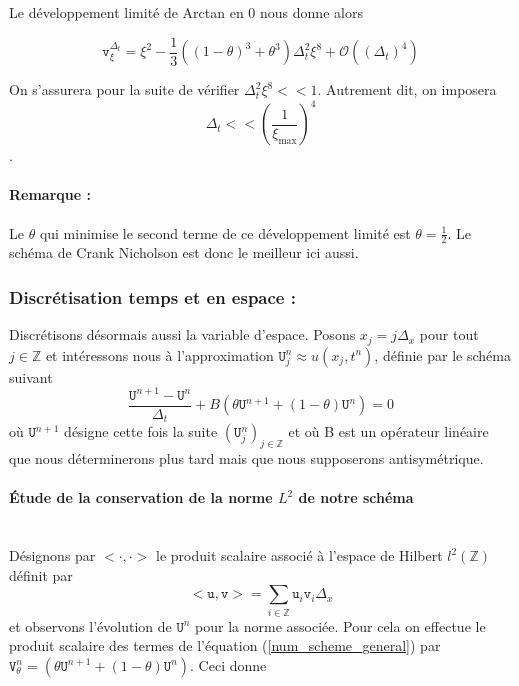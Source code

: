 \documentclass[12pt,a4paper]{article}
\numberwithin{equation}{section}
\begin{document}
Le développement limité de Arctan en 0 nous donne alors

\begin{equation}
    \texttt{v}_\xi^{\Delta_t} = \xi^2 - \frac{1}{3}\left((1-\theta)^3+\theta^3\right)\Delta_t^2\xi^8 + \mathcal{O}((\Delta_t)^4) 
\end{equation}

On s'assurera pour la suite de vérifier $\Delta_t^2\xi^8 << 1$. Autrement dit, on imposera $$\Delta_t << \left(\frac{1}{\xi_\text{max}}\right)^4$$.
\paragraph{Remarque :} Le $\theta$ qui minimise le second terme de ce développement limité est $\theta = \frac{1}{2}$. Le schéma de Crank Nicholson est donc le meilleur ici aussi.

\subsubsection{Discrétisation temps et en espace :}
Discrétisons désormais aussi la variable d'espace. Posons $x_j = j\Delta_x$ pour tout $j\in\mathbb{Z}$ et intéressons nous à l'approximation $\texttt{U}^n_j \approx u(x_j,t^n)$, définie par le schéma suivant
\begin{equation}
\frac{\texttt{U}^{n+1}-\texttt{U}^n}{\Delta_t} + B(\theta\texttt{U}^{n+1} + (1-\theta)\texttt{U}^{n}) = 0 \label{num_scheme_general}
\end{equation}
où $\texttt{U}^{n+1}$ désigne cette fois la suite $(\texttt{U}^n_j)_{j\in\mathbb{Z}}$ et où B est un opérateur linéaire que nous déterminerons plus tard mais que nous supposerons antisymétrique.\\

\paragraph{Étude de la conservation de la norme $L^2$ de notre schéma}\,\\

Désignons par $<\cdot,\cdot>$ le produit scalaire associé à l'espace de Hilbert $l^2(\mathbb{Z})$ définit par $$<\texttt{u},\texttt{v} > = \sum\limits_{i\in\mathbb{Z}}\texttt{u}_i\texttt{v}_i\Delta_x$$ et observons l'évolution de $\texttt{U}^n$ pour la norme associée. Pour cela on effectue le produit scalaire des termes de l'équation (\ref{num_scheme_general}) par $ \texttt{V}^n_\theta = (\theta\texttt{U}^{n+1} + (1-\theta)\texttt{U}^{n})$. Ceci donne
\end{document}
